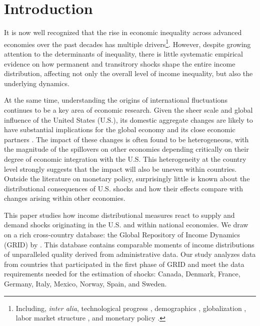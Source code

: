 \documentclass[12pt, a4paper]{article}
\begin{document}
\section{Introduction}
It is now well recognized that the rise in economic inequality across advanced economies over the past decades has multiple drivers\footnote{Including, \emph{inter alia}, technological progress \parencite{Bound1995, Acemoglu2002}, demographics \parencite{Karahan2013}, globalization \parencite{feenstra2003global}, labor market structure \parencite{jaumotte2015inequality}, and monetary policy \parencite{coibion2017innocent, furceri2018effects, Amberg2022, andersen2023monetary}.}. However, despite growing attention to the determinants of inequality, there is little systematic empirical evidence on how permanent and transitrory shocks shape the entire income distribution, affecting not only the overall level of income inequality, but also the underlying dynamics.

At the same time, understanding the origins of international fluctuations continues to be a key area of economic research. Given the sheer scale and global influence of the United States (U.S.), its domestic aggregate changes are likely to have substantial implications for the global economy and its close economic partners \parencite{Kose2003, canova2005transmission, Kose2012, kose2017global, kalemli2013global, Fink2015, rey2016, ramey2016macroeconomic, miranda2022global, carrillo2020inquiry, levchenko2020tfp, lakdawala2021international, dees2021global, di2022international, lastauskas2023global}. The impact of these changes is often found to be heterogeneous, with the magnitude of the spillovers on other economies depending critically on their degree of economic integration with the U.S. This heterogeneity at the country level strongly suggests that the impact will also be uneven within countries. Outside the literature on monetary policy, surprisingly little is known about the distributional consequences of U.S. shocks and how their effects compare with changes arising within other economies.

This paper studies how income distributional measures react to supply and demand shocks originating in the U.S. and within national economies. We draw on a rich cross-country database: the Global Repository of Income Dynamics (GRID) by \textcite{guvenen2022global}. This database contains comparable moments of income distributions of unparalleled quality derived from administrative data. Our study analyzes data from countries that participated in the first phase of GRID and meet the data requirements needed for the estimation of shocks: Canada, Denmark, France, Germany, Italy, Mexico, Norway, Spain, and Sweden.
\end{document}
